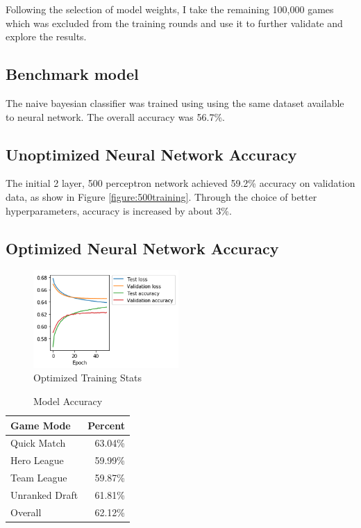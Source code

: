 \documentclass[twoside,twocolumn]{article}
\begin{document}
Following the selection of model weights, I take the remaining 100,000 games which was excluded from the training rounds and use it to further validate and explore the results.  

\subsection {Benchmark model}

The naive bayesian classifier was trained using  using the same dataset available to neural network.  The overall accuracy was 56.7\%.

\subsection {Unoptimized Neural Network Accuracy}


The initial 2 layer, 500 perceptron network achieved 59.2\% accuracy on validation data, as show in Figure \ref{figure:500training}.  Through the choice of better hyperparameters, accuracy is increased by about 3\%.

\subsection {Optimized Neural Network Accuracy}

\begin{figure}
\caption{Optimized Training Stats}
\label{figure:training}
\begin{adjustbox}{center}
\includegraphics[width=157pt]{training}
\end{adjustbox}
\centering
\end{figure}

\begin{table}[h]
\caption{Model Accuracy}
\label{table:acc}
\centering
\begin{tabular}{lr}
\toprule
Game Mode & Percent \\
\midrule
Quick Match & 63.04\% \\
Hero League & 59.99\% \\
Team League & 59.87\% \\
Unranked Draft & 61.81\% \\
\midrule
Overall & 62.12\% \\
\bottomrule
\end{tabular}
\end{table}
\end{document}
